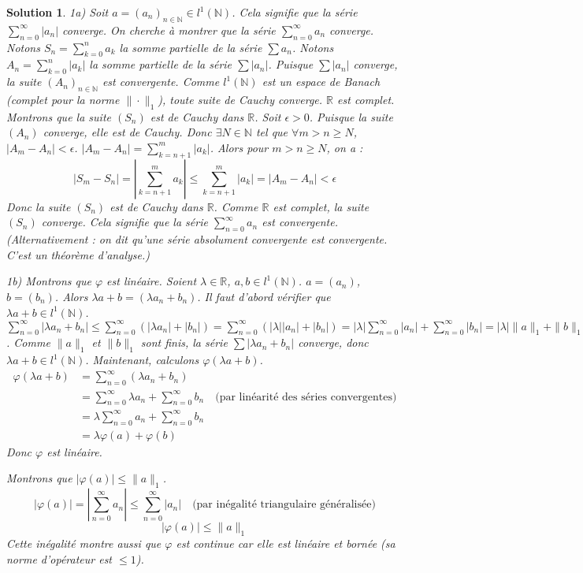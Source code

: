 \documentclass{article}
\newtheorem{solution}{Solution}
\begin{document}
\begin{solution}
1a) Soit $a = (a_n)_{n \in \mathbb{N}} \in l^1(\mathbb{N})$. Cela signifie que la série $\sum_{n=0}^\infty |a_n|$ converge.
On cherche à montrer que la série $\sum_{n=0}^\infty a_n$ converge.
Notons $S_n = \sum_{k=0}^n a_k$ la somme partielle de la série $\sum a_n$.
Notons $A_n = \sum_{k=0}^n |a_k|$ la somme partielle de la série $\sum |a_n|$.
Puisque $\sum |a_n|$ converge, la suite $(A_n)_{n \in \mathbb{N}}$ est convergente.
Comme $l^1(\mathbb{N})$ est un espace de Banach (complet pour la norme $\| \cdot \|_1$), toute suite de Cauchy converge. $\mathbb{R}$ est complet.
Montrons que la suite $(S_n)$ est de Cauchy dans $\mathbb{R}$.
Soit $\epsilon > 0$. Puisque la suite $(A_n)$ converge, elle est de Cauchy.
Donc $\exists N \in \mathbb{N}$ tel que $\forall m > n \ge N$, $|A_m - A_n| < \epsilon$.
$|A_m - A_n| = \sum_{k=n+1}^m |a_k|$.
Alors pour $m > n \ge N$, on a :
\[ |S_m - S_n| = \left| \sum_{k=n+1}^m a_k \right| \le \sum_{k=n+1}^m |a_k| = |A_m - A_n| < \epsilon \]
Donc la suite $(S_n)$ est de Cauchy dans $\mathbb{R}$. Comme $\mathbb{R}$ est complet, la suite $(S_n)$ converge.
Cela signifie que la série $\sum_{n=0}^\infty a_n$ est convergente.
(Alternativement : on dit qu'une série absolument convergente est convergente. C'est un théorème d'analyse.)

1b) Montrons que $\varphi$ est linéaire. Soient $\lambda \in \mathbb{R}$, $a, b \in l^1(\mathbb{N})$.
$a = (a_n)$, $b = (b_n)$. Alors $\lambda a + b = (\lambda a_n + b_n)$.
Il faut d'abord vérifier que $\lambda a + b \in l^1(\mathbb{N})$.
$\sum_{n=0}^\infty |\lambda a_n + b_n| \le \sum_{n=0}^\infty (|\lambda a_n| + |b_n|) = \sum_{n=0}^\infty (|\lambda| |a_n| + |b_n|) = |\lambda| \sum_{n=0}^\infty |a_n| + \sum_{n=0}^\infty |b_n| = |\lambda| \|a\|_1 + \|b\|_1$.
Comme $\|a\|_1$ et $\|b\|_1$ sont finis, la série $\sum |\lambda a_n + b_n|$ converge, donc $\lambda a + b \in l^1(\mathbb{N})$.
Maintenant, calculons $\varphi(\lambda a + b)$.
\begin{align*}
\varphi(\lambda a + b) &= \sum_{n=0}^\infty (\lambda a_n + b_n) \\
&= \sum_{n=0}^\infty \lambda a_n + \sum_{n=0}^\infty b_n \quad \text{(par linéarité des séries convergentes)} \\
&= \lambda \sum_{n=0}^\infty a_n + \sum_{n=0}^\infty b_n \\
&= \lambda \varphi(a) + \varphi(b)
\end{align*}
Donc $\varphi$ est linéaire.

Montrons que $|\varphi(a)| \le \|a\|_1$.
\[ |\varphi(a)| = \left| \sum_{n=0}^\infty a_n \right| \le \sum_{n=0}^\infty |a_n| \quad \text{(par inégalité triangulaire généralisée)} \]
\[ |\varphi(a)| \le \|a\|_1 \]
Cette inégalité montre aussi que $\varphi$ est continue car elle est linéaire et bornée (sa norme d'opérateur est $\le 1$).


\end{solution}
\end{document}
